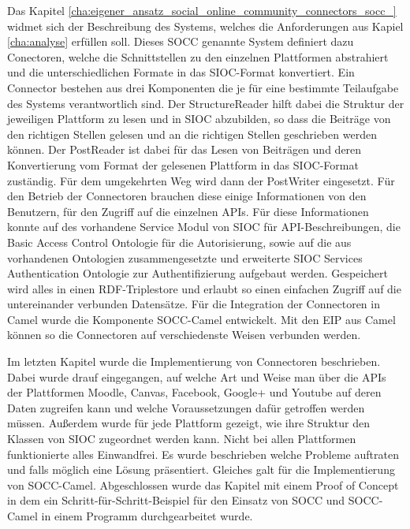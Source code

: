 Das Kapitel \ref{cha:eigener_ansatz_social_online_community_connectors_socc_} widmet sich der Beschreibung des Systems, welches die Anforderungen aus Kapiel \ref{cha:analyse} erfüllen soll. Dieses SOCC genannte System definiert dazu Conectoren, welche die Schnittstellen zu den einzelnen Plattformen abstrahiert und die unterschiedlichen Formate in das SIOC-Format konvertiert. Ein Connector bestehen aus drei Komponenten die je für eine bestimmte Teilaufgabe des Systems verantwortlich sind. Der StructureReader hilft dabei die Struktur der jeweiligen Plattform zu lesen und in SIOC abzubilden, so dass die Beiträge von den richtigen Stellen gelesen und an die richtigen Stellen geschrieben werden können. Der PostReader ist dabei für das Lesen von Beiträgen und deren Konvertierung vom Format der gelesenen Plattform in das SIOC-Format zuständig. Für dem umgekehrten Weg wird dann der PostWriter eingesetzt. Für den Betrieb der Connectoren brauchen diese einige Informationen von den Benutzern, für den Zugriff auf die einzelnen APIs. Für diese Informationen konnte auf des vorhandene Service Modul von SIOC für API-Beschreibungen, die Basic Access Control Ontologie für die Autorisierung, sowie auf die aus vorhandenen Ontologien zusammengesetzte und erweiterte SIOC Services Authentication Ontologie zur Authentifizierung aufgebaut werden. Gespeichert wird alles in einen RDF-Triplestore und erlaubt so einen einfachen Zugriff auf die untereinander verbunden Datensätze. Für die Integration der Connectoren in Camel wurde die Komponente SOCC-Camel entwickelt. Mit den EIP aus Camel können so die Connectoren auf verschiedenste Weisen verbunden werden.

Im letzten Kapitel wurde die Implementierung von Connectoren beschrieben. Dabei wurde drauf eingegangen, auf welche Art und Weise man über die APIs der  Plattformen Moodle, Canvas, Facebook, Google+ und Youtube auf deren Daten zugreifen kann und welche Voraussetzungen dafür getroffen werden müssen. Außerdem wurde für jede Plattform gezeigt, wie ihre Struktur den Klassen von SIOC zugeordnet werden kann. Nicht bei allen Plattformen funktionierte alles Einwandfrei. Es wurde beschrieben welche Probleme auftraten und falls möglich eine Lösung präsentiert. Gleiches galt für die Implementierung von SOCC-Camel. Abgeschlossen wurde das Kapitel mit einem Proof of Concept in dem ein Schritt-für-Schritt-Beispiel für den Einsatz von SOCC und SOCC-Camel in einem Programm durchgearbeitet wurde.


